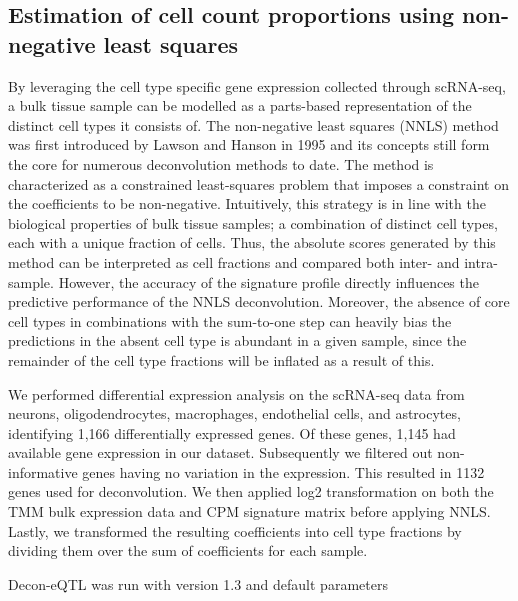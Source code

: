 \subsection{Estimation of cell count proportions using non-negative least squares}
By leveraging the cell type specific gene expression collected through scRNA-seq, a bulk tissue sample can be modelled as a parts-based representation of the distinct cell types it consists of. The non-negative least squares (NNLS) method was first introduced by Lawson and Hanson in 1995\cite{lawsonSolvingLeastSquares1995} and its concepts still form the core for numerous deconvolution methods to date. The method is characterized as a constrained least-squares problem that imposes a constraint on the coefficients to be non-negative. Intuitively, this strategy is in line with the biological properties of bulk tissue samples; a combination of distinct cell types, each with a unique fraction of cells. Thus, the absolute scores generated by this method can be interpreted as cell fractions and compared both inter- and intra-sample\cite{sturmComprehensiveEvaluationComputational2018}. However, the accuracy of the signature profile directly influences the predictive performance of the NNLS deconvolution. Moreover, the absence of core cell types in combinations with the sum-to-one step can heavily bias the predictions in the absent cell type is abundant in a given sample, since the remainder of the cell type fractions will be inflated as a result of this. 

We performed differential expression analysis on the scRNA-seq data from neurons, oligodendrocytes, macrophages, endothelial cells, and astrocytes, identifying 1,166 differentially expressed genes. Of these genes, 1,145 had available gene expression in our dataset. Subsequently we filtered out non-informative genes having no variation in the expression. This resulted in 1132 genes used for deconvolution. We then applied log2 transformation on both the TMM bulk expression data and CPM signature matrix before applying NNLS. Lastly, we transformed the resulting coefficients into cell type fractions by dividing them over the sum of coefficients for each sample\cite{galtonRegressionMediocrityHereditary1886}. 

Decon-eQTL\cite{raulaguirre-gamboaDeconvolutionBulkBlood2020} was run with version 1.3 and default parameters

